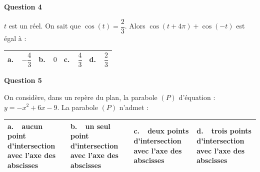 \textbf{Question 4}

$t$ est un réel. On sait que $\cos(t)= \dfrac{2}{3}$. Alors $\cos(t+4\pi) + \cos (-t)$ est égal à : 

\begin{center}
\begin{tabularx}{\linewidth}{|*{4}{X|}}\hline
\textbf{a.~~}$- \dfrac{4}{3}$&\textbf{b.~~}$0$&\textbf{c.~~}$\dfrac{4}{3}$&\textbf{d.~~}$\dfrac{2}{3}$\rule[-3mm]{0mm}{9mm}\\ \hline
\end{tabularx}
\end{center}

\medskip

\textbf{Question 5}

On considère, dans un repère du plan, la parabole $(P)$ d'équation : $y= - x^2 +6x - 9$. La parabole $(P)$ n'admet :

\begin{center}
\begin{tabularx}{\linewidth}{|*{4}{X|}}\hline
\textbf{a.~~}aucun point d'intersection avec l'axe des abscisses&\textbf{b.~~}un seul point d'intersection avec l'axe des abscisses&\textbf{c.~~}deux points d'intersection avec l'axe des abscisses&\textbf{d.~~}trois points d'intersection avec l'axe des abscisses\\ \hline
\end{tabularx}
\end{center}
\bigskip
